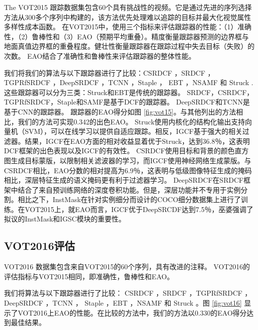 The VOT2015 \cite{Kristan2015TheVO} 跟踪数据集包含60个具有挑战性的视频。它是通过先进的序列选择方法从300多个序列中构建的，该方法优先处理难以追踪的目标并最大化视觉属性多样性成本函数。
在VOT2015中，使用三个指标来评估跟踪器的性能：（1）准确性，（2）鲁棒性和（3）EAO（预期平均重叠）。精度衡量跟踪器预测的边界框与地面真值边界框的重叠程度。健壮性衡量跟踪器在跟踪过程中失去目标（失败）的次数。 EAO结合了准确性和鲁棒性来评估跟踪器的整体性能。

我们将我们的算法与以下跟踪器进行了比较：CSRDCF \cite{Lukezic2017DiscriminativeCF}，SRDCF \cite{Danelljan2015LearningSR}，TGPRfSRDCF \cite{gao2018tracking}，DeepSRDCF \cite{Danelljan2015ConvolutionalFF}，TCNN \cite{nam2016modeling}，Staple \cite{Bertinetto2016StapleC}， EBT \cite{Zhu2016BeyondLS}，NSAMF \cite{Hua2015OnlineOT} 和 Struck \cite{Hare2011StruckSO}.
这些跟踪器可以分为三类：Struck和EBT是传统的跟踪器。 SRDCF，CSRDCF，TGPRfSRDCF，Staple和SAMF是基于DCF的跟踪器。 DeepSRDCF和TCNN是基于CNN的跟踪器。
跟踪器的EAO得分如图 \ref{fig:vot15}。与其他列出的方法相比，我们的方法可实现0.342的出色EAO。
Struck使用内核化的结构化输出支持向量机（SVM），可以在线学习以提供自适应跟踪。相反，IGCF基于强大的相关过滤器。结果，IGCF在EAO方面的相对收益显着优于Struck，达到36.8％，这表明DCF框架的出色表现以及IGCF的有效性。
CSRDCF使用目标和背景的颜色直方图生成目标蒙版，以限制相关滤波器的学习，而IGCF使用神经网络生成蒙版。与CSRDCF相比，EAO分数的相对提高为6.9％，这表明与低级图像特征生成的掩码相比，深层特征生成的语义掩码更有利于过滤器学习。
DeepSRDCF在SRDCF框架中结合了来自预训练网络的深度卷积功能。但是，深层功能并不专用于实例分割。相比之下，InstMask在针对实例细分而设计的COCO细分数据集上进行了训练。在VOT2015上，就EAO而言，IGCF优于DeepSRCDF达到7.5％，巫婆强调了拟议的InstMask和IGSC模块的重要性。

\subsection{VOT2016评估}
VOT2016 \cite{Kristan2016TheVO} 数据集包含来自VOT2015的60个序列，具有改进的注释。 VOT2016的评估指标与VOT2015相同，即准确性，鲁棒性和EAO。

我们将算法与以下跟踪器进行了比较：
CSRDCF \cite{Lukezic2017DiscriminativeCF}，SRDCF \cite{Danelljan2015LearningSR}，TGPRfSRDCF \cite{gao2018tracking}，DeepSRDCF \cite{Danelljan2015ConvolutionalFF}，TCNN \cite{nam2016modeling}， Staple \cite{Bertinetto2016StapleC}，EBT \cite{Zhu2016BeyondLS}，NSAMF \cite{Hua2015OnlineOT} 和 Struck \cite{Hare2011StruckSO}。图 \ref{fig:vot16} 显示了VOT2016上EAO的性能。在比较的方法中，我们的方法以0.330的EAO得分达到最佳结果。

